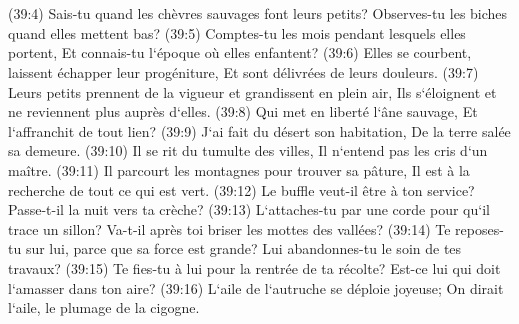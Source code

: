 \chapter{}

\verse (39:4) Sais-tu quand les chèvres sauvages font leurs petits? Observes-tu les biches quand elles mettent bas? 
\verse (39:5) Comptes-tu les mois pendant lesquels elles portent, Et connais-tu l`époque où elles enfantent? 
\verse (39:6) Elles se courbent, laissent échapper leur progéniture, Et sont délivrées de leurs douleurs. 
\verse (39:7) Leurs petits prennent de la vigueur et grandissent en plein air, Ils s`éloignent et ne reviennent plus auprès d`elles. 
\verse (39:8) Qui met en liberté l`âne sauvage, Et l`affranchit de tout lien? 
\verse (39:9) J`ai fait du désert son habitation, De la terre salée sa demeure. 
\verse (39:10) Il se rit du tumulte des villes, Il n`entend pas les cris d`un maître. 
\verse (39:11) Il parcourt les montagnes pour trouver sa pâture, Il est à la recherche de tout ce qui est vert. 
\verse (39:12) Le buffle veut-il être à ton service? Passe-t-il la nuit vers ta crèche? 
\verse (39:13) L`attaches-tu par une corde pour qu`il trace un sillon? Va-t-il après toi briser les mottes des vallées? 
\verse (39:14) Te reposes-tu sur lui, parce que sa force est grande? Lui abandonnes-tu le soin de tes travaux? 
\verse (39:15) Te fies-tu à lui pour la rentrée de ta récolte? Est-ce lui qui doit l`amasser dans ton aire? 
\verse (39:16) L`aile de l`autruche se déploie joyeuse; On dirait l`aile, le plumage de la cigogne. 
